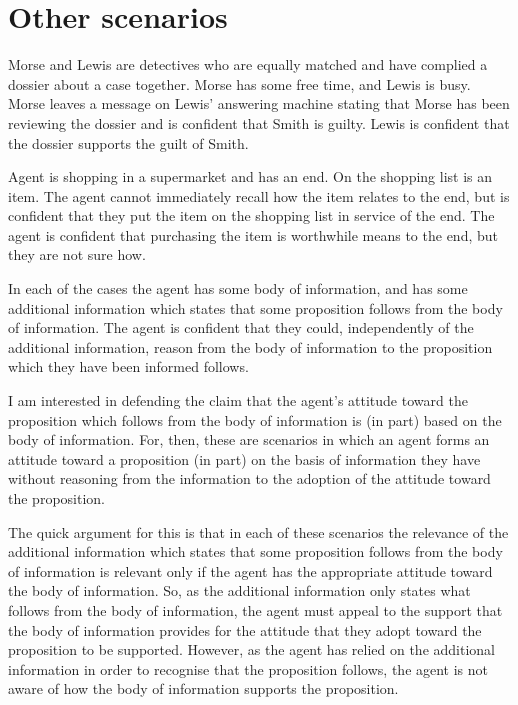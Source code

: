 \documentclass[10pt]{article}
\begin{document}
\section{Other scenarios}
\label{sec:other-scenarios}

\begin{scenario}[Morse]
  Morse and Lewis are detectives who are equally matched and have complied a dossier about a case together.
  Morse has some free time, and Lewis is busy.
  Morse leaves a message on Lewis' answering machine stating that Morse has been reviewing the dossier and is confident that Smith is guilty.
  Lewis is confident that the dossier supports the guilt of Smith.
\end{scenario}

\begin{scenario}[Shopping]
  Agent is shopping in a supermarket and has an end.
  On the shopping list is an item.
  The agent cannot immediately recall how the item relates to the end, but is confident that they put the item on the shopping list in service of the end.
  The agent is confident that purchasing the item is worthwhile means to the end, but they are not sure how.
\end{scenario}

In each of the cases the agent has some body of information, and has some additional information which states that some proposition follows from the body of information.
The agent is confident that they could, independently of the additional information, reason from the body of information to the proposition which they have been informed follows.

I am interested in defending the claim that the agent's attitude toward the proposition which follows from the body of information is (in part) based on the body of information.
For, then, these are scenarios in which an agent forms an attitude toward a proposition (in part) on the basis of information they have without reasoning from the information to the adoption of the attitude toward the proposition.

The quick argument for this is that in each of these scenarios the relevance of the additional information which states that some proposition follows from the body of information is relevant only if the agent has the appropriate attitude toward the body of information.
So, as the additional information only states what follows from the body of information, the agent must appeal to the support that the body of information provides for the attitude that they adopt toward the proposition to be supported.
However, as the agent has relied on the additional information in order to recognise that the proposition follows, the agent is not aware of how the body of information supports the proposition.
\end{document}
